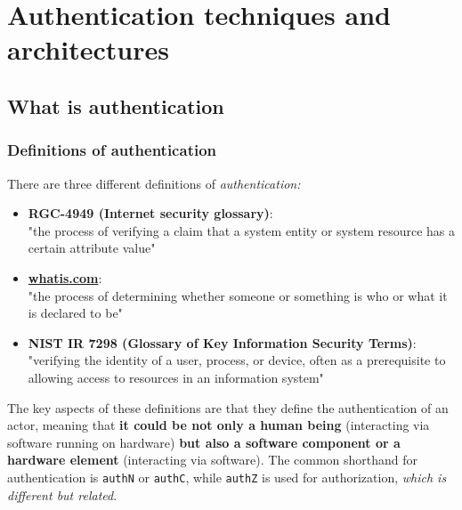 \chapter{Authentication techniques and architectures}

\section{What is authentication}


\subsection{Definitions of authentication}
There are three different definitions of \emph{authentication:}
\begin{itemize}
	\item \textbf{RGC-4949 (Internet security glossary)}:\\
	      "the process of verifying a claim that a system entity or system
	      resource has a certain attribute value"
	\item \textbf{\url{whatis.com}}:\\
	      "the process of determining whether someone or something is
	      who or what it is declared to be"
	\item \textbf{NIST IR 7298 (Glossary of Key Information Security Terms)}:\\
	      "verifying the identity of a user, process, or device, often as a
	      prerequisite to allowing access to resources in an information
	      system"
\end{itemize}
The key aspects of these definitions  are that they define the authentication of an actor, meaning that \textbf{it could be not only a human being} (interacting via software running on hardware) \textbf{but also a software component or a hardware element} (interacting via software). The common shorthand for authentication is \texttt{authN} or \texttt{authC}, while \texttt{authZ} is used for authorization, \textit{which is different but related}.


